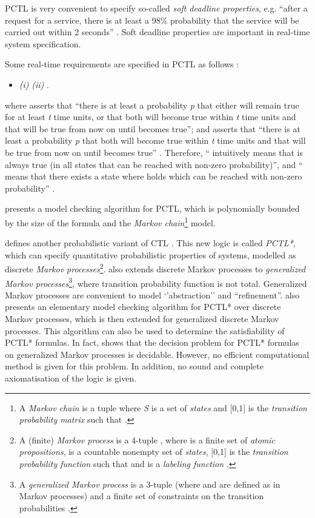 \documentclass[11pt]{article}
\begin{document}
PCTL is very convenient to specify so-called \emph{soft deadline properties}, e.g. ``after a request for a service, there is at least a 98\% probability that the service will be carried out within 2 seconds'' \cite{HJ94}. Soft deadline properties are important in real-time system specification. 

Some real-time requirements are specified in PCTL as follows \cite{HJ94}:

\begin{itemize}
\item \emph{(i)}    \emph{(ii)} . 
\end{itemize}

\noindent where  asserts that ``there is at least a probability \emph{p} that either  will remain true for at least \emph{t} time units, or that both  will become true within \emph{t} time units and that  will be true from now on until  becomes true''; and  asserts that ``there is at least a probability \emph{p} that both  will become true within \emph{t} time units and that  will be true from now on until  becomes true'' \cite{HJ94}. Therefore, `` intuitively means that  is always true (in all states that can be reached with non-zero probability)'', and ``  means that there exists a state where  holds which can be reached with non-zero probability'' \cite{HJ94}.

\cite{HJ94} presents a model checking algorithm for  PCTL, which is polynomially bounded by the size of the formula  and the \emph{Markov chain}\footnote{A \emph{Markov chain} is a tuple  where \emph{S} is a set of \emph{states} and  [0,1] is the \emph{transition probability matrix} such that   \cite{Rab03}.} model.

\cite{ASB95} defines another probabilistic variant of CTL \cite{CES86}. This new logic is called \emph{PCTL*}, which can specify quantitative probabilistic properties of systems, modelled as discrete \emph{Markov processes}\footnote{A (finite) \emph{Markov process} is a 4-tuple , where  is a finite set of \emph{atomic propositions},  is a countable nonempty set of \emph{states},  [0,1] is the \emph{transition probability function} such that  and  is a \emph{labeling function} \cite{ASB95}.}. \cite{CES86} also extends discrete Markov processes to  \emph{generalized Markov processes}\footnote{A \emph{generalized Markov process} is a 3-tuple  (where  and  are defined as in Markov processes) and a finite set of constraints on the transition probabilities \cite{ASB95}.}, where transition probability function is not total. Generalized Markov processes are convenient to model `'abstraction'' and ``refinement''.  \cite{ASB95} also presents an elementary model checking algorithm for PCTL* over discrete Markov processes, which is then extended for generalized discrete Markov processes. This algorithm can also be used to determine the satisfiability of PCTL* formulas. In fact, \cite{ASB95} shows that the decision problem for PCTL* formulas on generalized Markov processes is decidable. However, no efficient computational method is given for this problem. In addition, no sound and complete axiomatisation of the logic is given.
\end{document}
